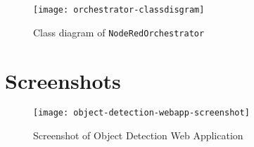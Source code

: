\begin{figure}[htb]
    \centering
    \texttt{[image: orchestrator-classdisgram]}
    \caption{Class diagram of \texttt{NodeRedOrchestrator}}
    \label{fig:orchestrator-classdisgram}
\end{figure}

\clearpage
\chapter{Screenshots\label{cha:appendix-screenshots}}
\begin{figure}[htb]
    \centering
    \texttt{[image: object-detection-webapp-screenshot]}
    \caption{Screenshot of Object Detection Web Application}
    \label{fig:object-detection-webapp-screenshot}
\end{figure}